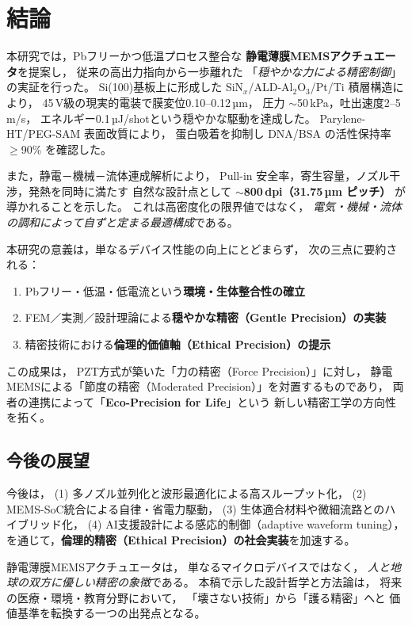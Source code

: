 \section{結論}

本研究では，Pbフリーかつ低温プロセス整合な
\textbf{静電薄膜MEMSアクチュエータ}を提案し，
従来の高出力指向から一歩離れた
「\emph{穏やかな力による精密制御}」の実証を行った。
Si(100)基板上に形成した SiN$_x$/ALD-Al$_2$O$_3$/Pt/Ti 積層構造により，
45\,V級の現実的電装で膜変位0.10–0.12\,µm，
圧力 $\sim$50\,kPa，吐出速度2–5\,m/s，
エネルギー0.1\,µJ/shotという穏やかな駆動を達成した。
Parylene-HT/PEG-SAM 表面改質により，
蛋白吸着を抑制し DNA/BSA の活性保持率 $\ge$90\% を確認した。

また，静電－機械－流体連成解析により，
Pull-in 安全率，寄生容量，ノズル干渉，発熱を同時に満たす
自然な設計点として \textbf{$\sim$800\,dpi（31.75\,µm ピッチ）} が導かれることを示した。
これは高密度化の限界値ではなく，
\emph{電気・機械・流体の調和によって自ずと定まる最適構成}である。

本研究の意義は，単なるデバイス性能の向上にとどまらず，
次の三点に要約される：
\begin{enumerate}[label=(\arabic*),leftmargin=6mm]
\item Pbフリー・低温・低電流という\textbf{環境・生体整合性の確立}  
\item FEM／実測／設計理論による\textbf{穏やかな精密（Gentle Precision）の実装}  
\item 精密技術における\textbf{倫理的価値軸（Ethical Precision）の提示}  
\end{enumerate}

この成果は，
PZT方式が築いた「力の精密（Force Precision）」に対し，
静電MEMSによる「節度の精密（Moderated Precision）」を対置するものであり，
両者の連携によって「\textbf{Eco-Precision for Life}」という
新しい精密工学の方向性を拓く。

\subsection*{今後の展望}
今後は，
(1) 多ノズル並列化と波形最適化による高スループット化，  
(2) MEMS-SoC統合による自律・省電力駆動，  
(3) 生体適合材料や微細流路とのハイブリッド化，  
(4) AI支援設計による感応的制御（adaptive waveform tuning），  
を通じて，\textbf{倫理的精密（Ethical Precision）の社会実装}を加速する。

静電薄膜MEMSアクチュエータは，
単なるマイクロデバイスではなく，
\emph{人と地球の双方に優しい精密の象徴}である。
本稿で示した設計哲学と方法論は，
将来の医療・環境・教育分野において，
「壊さない技術」から「護る精密」へと
価値基準を転換する一つの出発点となる。

